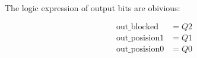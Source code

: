 \begin{multicols}{2}
\begin{align*}
        \end{align*}
        \columnbreak
    \end{multicols}

\newpage

\noindent
The logic expression of output bits are obivious:

\begin{align*}
    \text{out\_blocked} &=  Q2 \\
    \text{out\_posision1} &= Q1 \\
    \text{out\_posision0} &= Q0
\end{align*}


\newpage
